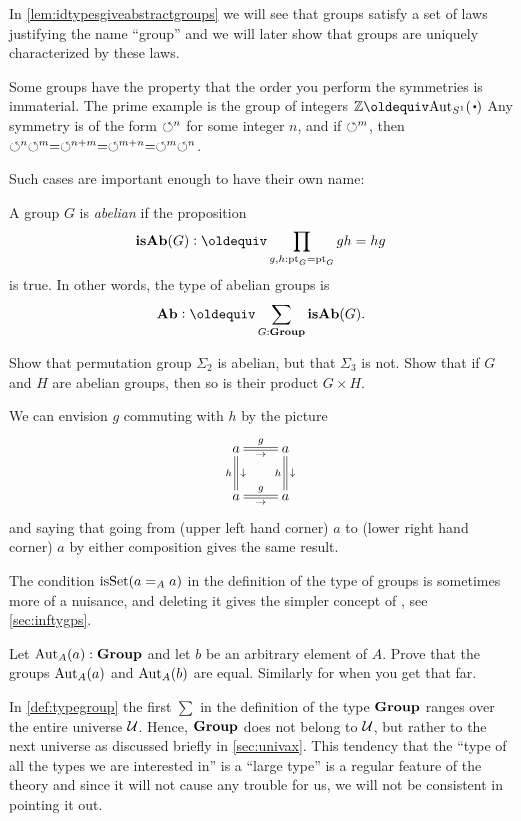\begin{remark}
In \cref{lem:idtypesgiveabstractgroups} we will see that groups satisfy a set of laws justifying the name ``group''
and we will later show that groups are uniquely characterized by these laws.
\end{remark}
Some groups have the property that the order you perform the symmetries is immaterial.  The prime example is the group of integers $\ZZ\oldequiv \aut_{S^1}(\base)$  Any symmetry is of the form $\circlearrowleft^n$ for some integer $n$, and if $\circlearrowleft^m$, then $\circlearrowleft^n\circlearrowleft^m=\circlearrowleft^{n+m}=\circlearrowleft^{m+n}=\circlearrowleft^m\circlearrowleft^n$.

 Such cases are important enough to have their own name:
\begin{definition}\label{def:abgp}
  A group $G$ is \emph{abelian} if %
the proposition
$$\mathbf{isAb}(G)\defequi\prod_{g,h:\pt_G=\pt_G}gh=hg$$
is true.  In other words, the type of abelian groups is 
$$\mathbf{Ab}\defequi \sum_{G:\typegroup}\mathbf{isAb}(G).$$
\end{definition}
\begin{xca}\label{exer:first examples}
  Show that permutation group $\Sigma_2$ is abelian, but that $\Sigma_3$ is not.  Show that if $G$ and $H$ are abelian groups, then so is their product $G\times H$.
\end{xca}
We can envision $g$ commuting with $h$ by the picture
$$\xymatrix{a\ar@{=}[r]^g_\to\ar@{=}[d]^\downarrow_h&a\ar@{=}[d]^\downarrow_h\\
a\ar@{=}[r]^g_\to&a}$$
and saying that going from (upper left hand corner) $a$ to (lower right hand corner) $a$ by either composition gives the same result.

\begin{remark}
  The condition $\mathrm{isSet}(a=_Aa)$ in the definition of the type of groups is sometimes more of a nuisance, and deleting it gives the simpler concept of \aninftygp, see \cref{sec:inftygps}.
\end{remark}
\begin{xca}
   Let $\mathrm{Aut}_A(a):\mathbf{Group}$ and let $b$ be an arbitrary element of $A$.  Prove that the groups $\mathrm{Aut}_A(a)$ and $\mathrm{Aut}_A(b)$ are equal.  Similarly for \inftygps when you get that far.
\end{xca}
\begin{remark}\label{rem:monoidandabsgplarge}
 In \cref{def:typegroup} the first $\sum$ in the definition of the type $\mathbf{Group}$ ranges over the entire universe $\mathcal{U}$.  Hence, $\mathbf{Group}$ does not belong to $\mathcal{U}$, but rather to the next universe as discussed briefly in \cref{sec:univax}.   This tendency that the ``type of all the types we are interested in'' is a ``large type'' is a regular feature of the theory and since it will not cause any trouble for us, we will not be consistent in pointing it out.
  \end{remark}

